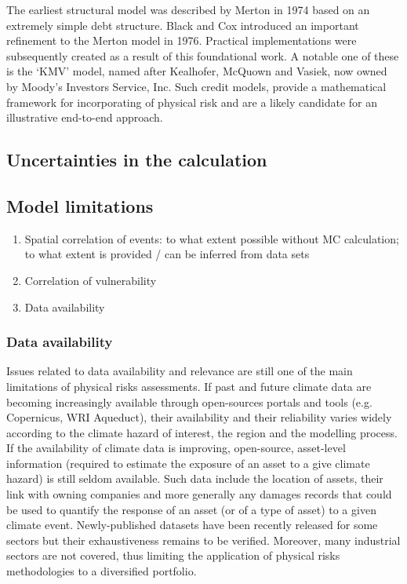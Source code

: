 \documentclass[a4paper,11pt]{extarticle} %
\theoremstyle{definition}
\begin{document}
The earliest structural model was described by Merton in 1974 \cite{Merton:1974} based on an extremely simple debt structure. Black and Cox \cite{BlackCox:1976} introduced an important refinement to the Merton model in 1976. Practical implementations were subsequently created as a result of this foundational work. A notable one of these is the `KMV' model, named after Kealhofer, McQuown and Vasiek, now owned by Moody's Investors Service, Inc. Such credit models, provide a mathematical framework for incorporating of physical risk \cite{KenyonEtAl:2021} and are a likely candidate for an illustrative end-to-end approach.

\subsection{Uncertainties in the calculation}

\subsection{Model limitations}

\begin{enumerate}
    \item Spatial correlation of events: to what extent possible without MC calculation; to what extent is provided / can be inferred from data sets
    \item Correlation of vulnerability
    \item Data availability
\end{enumerate}


\subsubsection{Data availability}
Issues related to data availability and relevance are still one of the main limitations of physical risks assessments. If past and future climate data are becoming increasingly available through open-sources portals and tools (e.g. Copernicus, WRI Aqueduct), their availability and their reliability varies widely according to the climate hazard of interest, the region and the modelling process. If the availability of climate data is improving, open-source, asset-level information (required to estimate the exposure of an asset to a give climate hazard) is still seldom available. Such data include the location of assets, their link with owning companies and more generally any damages records that could be used to quantify the response of an asset (or of a type of asset) to a given climate event. Newly-published datasets have been recently released for some sectors but their exhaustiveness remains to be verified. Moreover, many industrial sectors are not covered, thus limiting the application of physical risks methodologies to a diversified portfolio.
\end{document}
